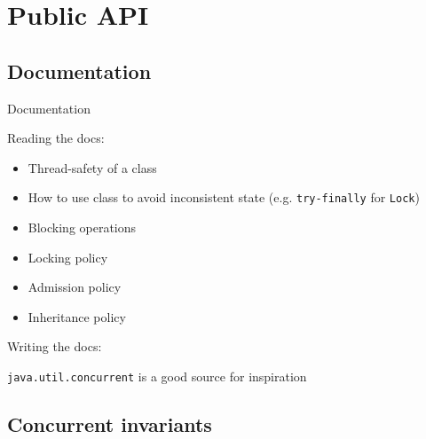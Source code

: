\section{Public API}
\showTOC

\subsection{Documentation}

\begin{frame}{Documentation}

Reading  the docs:
\begin{itemize}
  \item Thread-safety of a class
  \item How to use class to avoid inconsistent state (e.g. \texttt{try-finally} for \texttt{Lock})
  \item Blocking operations
  \item Locking policy
  \item Admission policy
  \item Inheritance policy
\end{itemize}

\pause

 {Writing the docs:}

\pause
\pause

\texttt{java.util.concurrent} is a good source for inspiration

\end{frame}


\subsection{Concurrent invariants}


